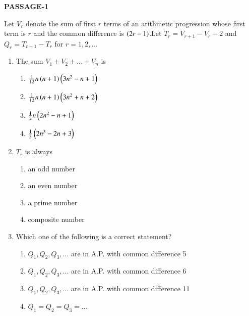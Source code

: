 \documentclass[journal,12pt,twocolumn]{IEEEtran}
\theoremstyle{remark}
\begin{document}
    \begin{center}    
      \textbf{PASSAGE-1}
    \end{center}
 Let $ V_{r} $ denote the sum of first $r$ terms of an arithmetic progression  whose first term is $r$ and the common difference is $\left(2r-1\right)$.Let $ T_{r}=V_{r+1}-V_{r}-2 $ and $ Q_{r}=T_{r+1}-T_{r}$ for $r=1,2,...$
 \\ 
 \begin{enumerate}

 \item The sum  $  V_{1}+V_{2}+...+V_{n} $  is 
 
	 \hfill {}                            
     \begin{enumerate}
         
	     \item $\frac{1}{12}n\left(n+1\right)\left(3n^{2}-n+1\right)$
	     \item $\frac{1}{12}n\left(n+1\right)\left(3n^{2}+n+2\right)$
	     \item $\frac{1}{2}n\left(2n^{2}-n+1\right)$
	     \item $\frac{1}{3}\left(2n^{3}-2n+3\right)$
    \end{enumerate} 

  \item $T_{r}$ is always 
                           
	  \hfill {}                    
                  \begin{multicols}{2}      
                        \begin{enumerate} 
	
       \item an odd number 
       \item an even number
	\item a prime number 
        \item composite number

	  \end{enumerate}
   \end{multicols}
    \item Which one of the following is a correct statement? 
          
	    \hfill {}                                  
     \begin{enumerate}
	\item $Q_{1},Q_{2},Q_{3},...$ are in A.P. with common difference 5 
	\item $Q_{1},Q_{2},Q_{3},...$ are in A.P. with common difference 6
	\item $Q_{1},Q_{2},Q_{3},...$ are in A.P. with common difference 11
	\item $Q_{1}=Q_{2}=Q_{3}=...$
     \end{enumerate}



 \end{enumerate}

	






    
\end{document}

